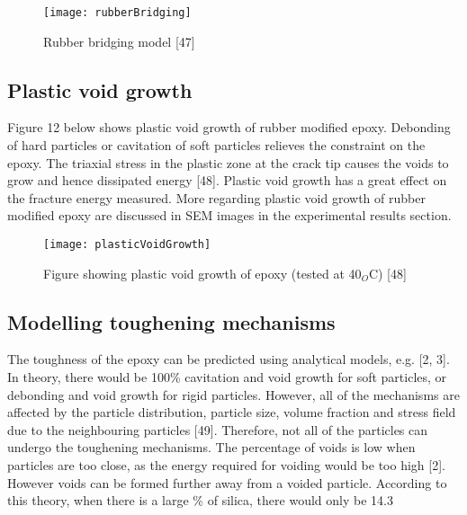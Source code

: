 \documentclass[numbers=noendperiod,chapterprefix=on]{icldt} %
\begin{document}
\begin{figure}[!htpb]
\centering
\texttt{[image: rubberBridging]}
\caption{Rubber bridging model [47]} %
\end{figure}

\subsection{Plastic void growth}
Figure 12 below shows plastic void growth of rubber modified epoxy. Debonding of hard particles or cavitation of soft particles relieves the constraint on the epoxy. The triaxial stress in the plastic zone at the crack tip causes the voids to grow and hence dissipated energy [48]. Plastic void growth has a great effect on the fracture energy measured. More regarding plastic void growth of rubber modified epoxy are discussed in SEM images in the experimental results section.

\begin{figure}[!htpb]
\centering
\texttt{[image: plasticVoidGrowth]}
\caption{Figure showing plastic void growth of epoxy (tested at 40$_O$C) [48]} %
\end{figure}

\subsection{Modelling toughening mechanisms}
The toughness of the epoxy can be predicted using analytical models, e.g. [2, 3]. In theory, there would be 100\% cavitation and void growth for soft particles, or debonding and void growth for rigid particles. However, all of the mechanisms are affected by the particle distribution, particle size, volume fraction and stress field due to the neighbouring particles [49]. Therefore, not all of the particles can undergo the toughening mechanisms. 
The percentage of voids is low when particles are too close, as the energy required for voiding would be too high [2]. However voids can be formed further away from a voided particle. According to this theory, when there is a large \% of silica, there would only be 14.3 %
\end{document}

